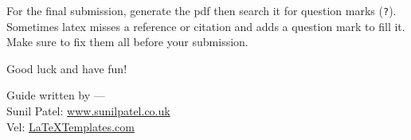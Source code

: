 For the final submission, generate the pdf then search it for question marks (\verb|?|). Sometimes latex misses a reference or citation and adds a question mark to fill it. Make sure to fix them all before your submission.

Good luck and have fun!

\begin{flushright}
Guide written by ---\\
Sunil Patel: \href{http://www.sunilpatel.co.uk}{www.sunilpatel.co.uk}\\
Vel: \href{http://www.LaTeXTemplates.com}{LaTeXTemplates.com}\\
\end{flushright}
